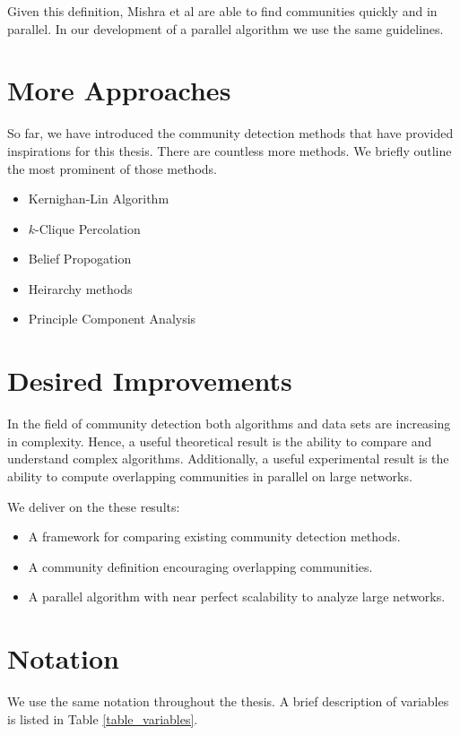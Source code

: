 \documentclass[phd,tocprelim]{cornell}
\begin{document}
Given this definition, Mishra et al\cite{mishra} are able to find communities quickly and in parallel.  In our development of a parallel algorithm we use the same guidelines.

\section {More Approaches}

So far, we have introduced the community detection methods that have provided inspirations for this thesis.  There are countless more methods.  We briefly outline the most prominent of those methods.

\begin{itemize}
\item Kernighan-Lin Algorithm
\item $k$-Clique Percolation
\item Belief Propogation
\item Heirarchy methods
\item Principle Component Analysis
\end{itemize}


\section {Desired Improvements}

In the field of community detection both algorithms and data sets are increasing in complexity.  Hence, a useful theoretical result is the ability to compare and understand complex algorithms.  Additionally, a useful experimental result is the ability to compute overlapping communities in parallel on large networks.

We deliver on the these results:
\begin{itemize}
\item A framework for comparing existing community detection methods.
\item A community definition encouraging overlapping communities.
\item A parallel algorithm with near perfect scalability to analyze large networks.
\end{itemize}


\section{Notation}

We use the same notation throughout the thesis. A brief description of variables is listed in Table \ref{table_variables}. 
\end{document}

